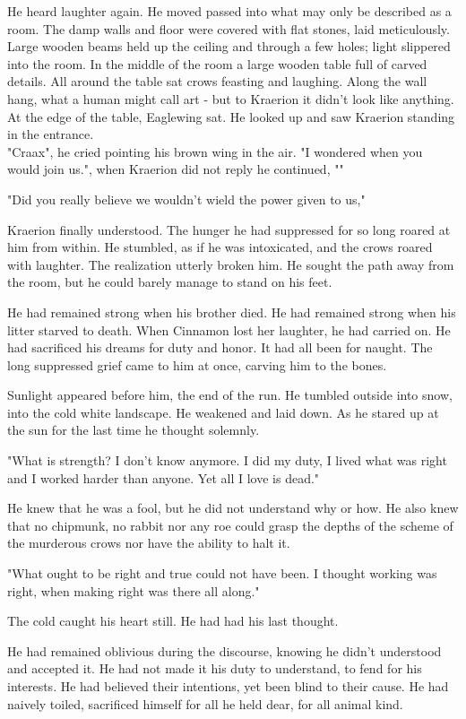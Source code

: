 \documentclass[smalldemyvopaper,11pt,twoside,onecolumn,openright,extrafontsizes]{memoir}
\begin{document}
He heard laughter again. He moved passed into what may only be described as a room. The damp walls and floor were covered with flat stones, laid meticulously. Large wooden beams held up the ceiling and through a few holes; light slippered into the room. In the middle of the room a large wooden table full of carved details. All around the table sat crows feasting and laughing. Along the wall hang, what a human might call art - but to Kraerion it didn't look like anything. At the edge of the table, Eaglewing sat. He looked up and saw Kraerion standing in the entrance.\\

"Craax", he cried pointing his brown wing in the air. "I wondered when you would join us.", when Kraerion did not reply he continued, ""


"Did you really believe we wouldn't wield the power given to us,"

Kraerion finally understood. The hunger he had suppressed for so long roared at him from within. He stumbled, as if he was intoxicated, and the crows roared with laughter. The realization utterly broken him. He sought the path away from the room, but he could barely manage to stand on his feet.

He had remained strong when his brother died. He had remained strong when his litter starved to death. When Cinnamon lost her laughter, he had carried on. He had sacrificed his dreams for duty and honor. It had all been for naught. The long suppressed grief came to him at once, carving him to the bones.

Sunlight appeared before him, the end of the run. He tumbled outside into snow, into the cold white landscape. He weakened and laid down. As he stared up at the sun for the last time he thought solemnly.

"What is strength? I don't know anymore. I did my duty, I lived what was right and I worked harder than anyone. Yet all I love is dead."

He knew that he was a fool, but he did not understand why or how. He also knew that no chipmunk, no rabbit nor any roe could grasp the depths of the scheme of the murderous crows nor have the ability to halt it.

"What ought to be right and true could not have been. I thought working was right, when making right was there all along."

The cold caught his heart still. He had had his last thought. 

He had remained oblivious during the discourse, knowing he didn't understood and accepted it. He had not made it his duty to understand, to fend for his interests. He had believed their intentions, yet been blind to their cause. He had naively toiled, sacrificed himself for all he held dear, for all animal kind.    
\end{document}
